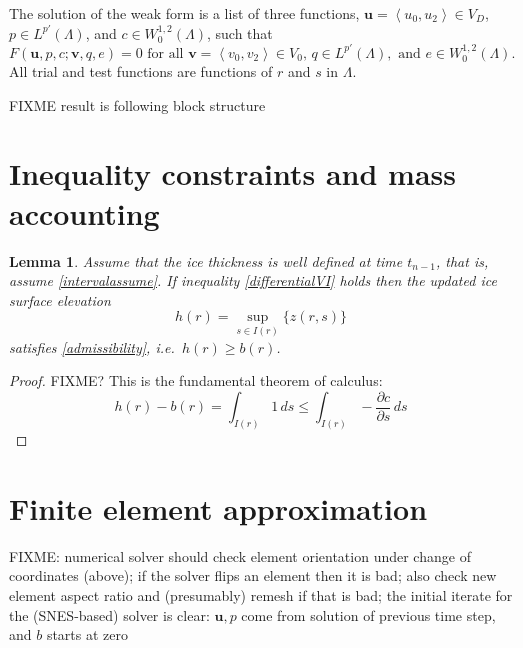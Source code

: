 \documentclass[letterpaper,final,12pt,reqno]{amsart}
\newcommand{\bu}{\mathbf{u}}
\newcommand{\bv}{\mathbf{v}}
\newtheorem{lemma}{Lemma}
\begin{document}
The solution of the weak form is a list of three functions, $\bu = \left<u_0,u_2\right> \in V_D$, $p\in L^{p'}(\Lambda)$, and $c\in W^{1,2}_0(\Lambda)$, such that
\begin{equation}
F(\bu,p,c;\bv,q,e) = 0 \text{ for all } \bv = \left<v_0,v_2\right> \in V_0, \, q\in L^{p'}(\Lambda), \text{ and } e \in W^{1,2}_0(\Lambda).
\end{equation}
All trial and test functions are functions of $r$ and $s$ in $\Lambda$.

FIXME result is following block structure


\section{Inequality constraints and mass accounting} \label{sec:inequalities}

\begin{lemma}
Assume that the ice thickness is well defined at time $t_{n-1}$, that is, assume
\eqref{intervalassume}.  If inequality \eqref{differentialVI} holds then the updated ice surface elevation
    $$h(r) = \sup_{s\in I(r)}\{z(r,s)\}$$
satisfies \eqref{admissibility}, i.e.~$h(r)\ge b(r)$.
\end{lemma}

\begin{proof}
FIXME? This is the fundamental theorem of calculus:
    $$h(r) - b(r) = \int_{I(r)} 1\,ds \le \int_{I(r)} - \frac{\partial c}{\partial s}\,ds$$
\end{proof}


\section{Finite element approximation}  \label{sec:finiteelement}

FIXME: numerical solver should check element orientation under change of coordinates (above); if the solver flips an element then it is bad; also check new element aspect ratio and (presumably) remesh if that is bad; the initial iterate for the (SNES-based) solver is clear: $\bu,p$ come from solution of previous time step, and $b$ starts at zero



\small

\bigskip


\end{document}
